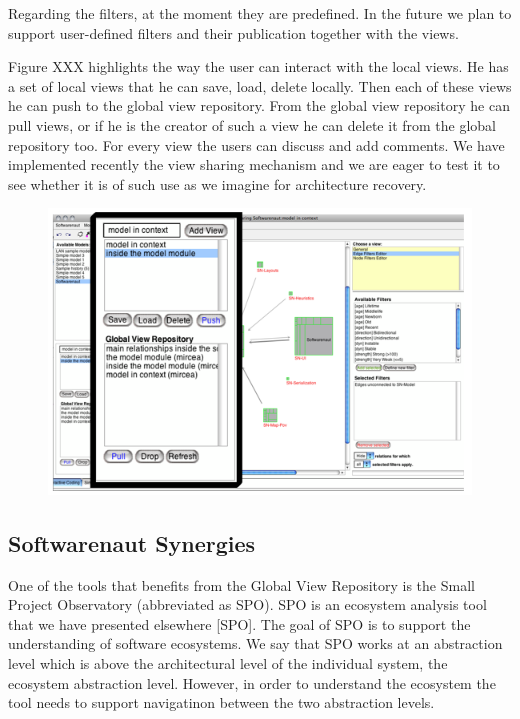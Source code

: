 \documentclass[preprint,12pt]{elsarticle}
\begin{document}
Regarding the filters, at the moment they are predefined. In the future we plan to support user-defined filters and their publication together with the views. 

Figure XXX highlights the way the user can interact with the local views. He has a set of local views that he can save, load, delete locally. Then each of these views he can push to the global view repository. From the global view repository he can pull views, or if he is the creator of such a view he can delete it from the global repository too. For every view the users can discuss and add comments. We have implemented recently the view sharing mechanism and we are eager to test it to see whether it is of such use as we imagine for architecture recovery. 

\begin{figure}[h]
\begin{center}
\includegraphics[width=\linewidth]{images/ViewOperations.png}
\caption{}
\label{}
\end{center}
\end{figure}


\subsection {Softwarenaut Synergies}
One of the tools that benefits from the Global View Repository is the Small Project Observatory (abbreviated as SPO). SPO is an ecosystem analysis tool that we have presented elsewhere [SPO]. The goal of SPO is to support the understanding of software ecosystems. We say that SPO works at an abstraction level which is above the architectural level of the individual system, the ecosystem abstraction level. However, in order to understand the  ecosystem the tool needs to support navigatinon between the two abstraction levels. 
\end{document}
